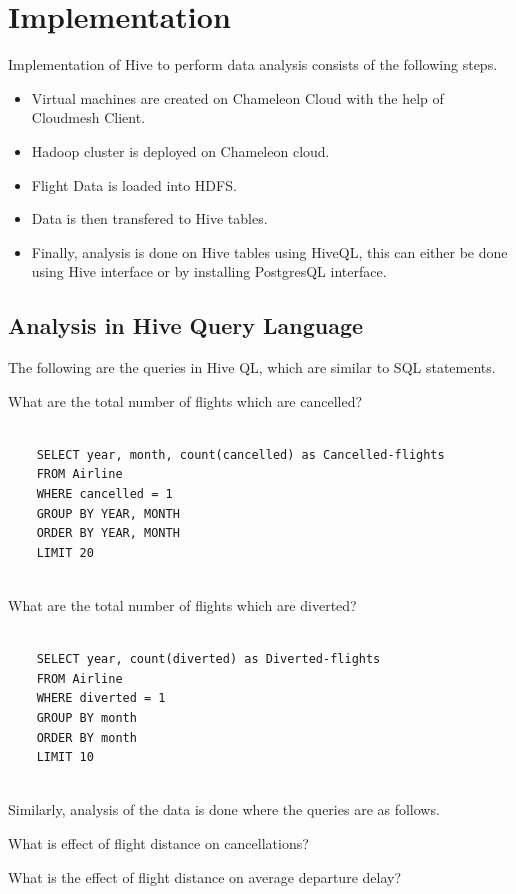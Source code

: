 \documentclass[9pt,twocolumn,twoside]{../../styles/osajnl}
\begin{document}
\section{Implementation}

Implementation of Hive to perform data analysis consists of the
following steps.
\begin{itemize}
  \item Virtual machines are created on Chameleon Cloud with the help
    of Cloudmesh Client.    
  \item Hadoop cluster is deployed on Chameleon cloud.
  \item Flight Data is loaded into HDFS.
  \item Data is then transfered to Hive tables.
  \item Finally, analysis is done on Hive tables using HiveQL, this
    can either be done using Hive interface or by installing
    PostgresQL interface.
\end{itemize}

\subsection{Analysis in Hive Query Language}
  The following are the queries in Hive QL, which are similar to SQL
  statements.
 
  What are the total number of flights which are cancelled?
  \begin{verbatim}

    SELECT year, month, count(cancelled) as Cancelled-flights
    FROM Airline
    WHERE cancelled = 1
    GROUP BY YEAR, MONTH
    ORDER BY YEAR, MONTH
    LIMIT 20
    
  \end{verbatim} 

  What are the total number of flights which are diverted?
  \begin{verbatim}

    SELECT year, count(diverted) as Diverted-flights
    FROM Airline
    WHERE diverted = 1
    GROUP BY month
    ORDER BY month
    LIMIT 10
    
  \end{verbatim}

  Similarly, analysis of the data is done where the queries are as follows.
  
  What is effect of flight distance on cancellations?
  
  What is the effect of flight distance on average departure delay?
  
\end{document}
